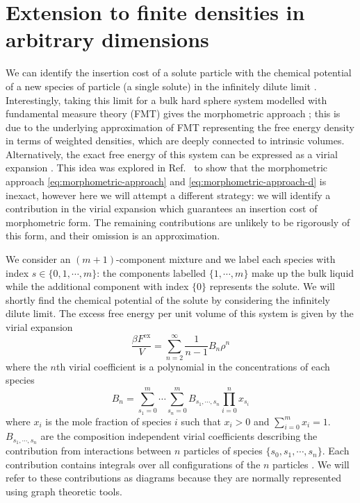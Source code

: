 \documentclass[11pt,twoside]{report}
\begin{document}
\section{Extension to finite densities in arbitrary dimensions}
\label{sec:finite-densities}

We can identify the insertion cost of a solute particle with the chemical potential of a new species of particle (a single solute) in the infinitely dilute limit \cite{ReissJCP1959,Hansen-GoosJPCM2006,Hansen-GoosJCP2014}.
Interestingly, taking this limit for a bulk hard sphere system modelled with fundamental measure theory (FMT) gives the morphometric approach \cite{Hansen-GoosJPCM2006}; this is due to the underlying approximation of FMT representing the free energy density in terms of weighted densities, which are deeply connected to intrinsic volumes.
Alternatively, the exact free energy of this system can be expressed as a virial expansion \cite{Hansen2013}.
This idea was explored in Ref.\ \cite{Hansen-GoosJPCM2006} to show that the morphometric approach \eqref{eq:morphometric-approach} and \eqref{eq:morphometric-approach-d} is inexact, however here we will attempt a different strategy: we will identify a contribution in the virial expansion which guarantees an insertion cost of morphometric form.
The remaining contributions are unlikely to be rigorously of this form, and their omission is an approximation.

We consider an $(m+1)$-component mixture and we label each species with index $s \in \{0, 1, \cdots, m\}$: the components labelled $\{1, \cdots, m\}$ make up the bulk liquid while the additional component with index $\{0\}$ represents the solute.
We will shortly find the chemical potential of the solute by considering the infinitely dilute limit.
The excess free energy per unit volume of this system is given by the virial expansion \cite{Hansen2013,Santos2016}
\begin{equation}
  \frac{\beta F^\mathrm{ex}}{V} =
  \sum_{n=2}^\infty
  \frac{1}{n-1}
  B_n
  \rho^n
\end{equation}
where the $n$th virial coefficient is a polynomial in the concentrations of each species
\begin{equation}
  B_n =
  \sum_{s_1=0}^m \cdots \sum_{s_n=0}^m
  B_{s_1, \cdots, s_n} \prod_{i=0}^n x_{s_i}
\end{equation}
where $x_i$ is the mole fraction of species $i$ such that $x_i > 0$ and $\sum_{i=0}^m x_i = 1$.
$B_{s_1, \cdots, s_n}$ are the composition independent virial coefficients describing the contribution from interactions between $n$ particles of species $\{s_0, s_1, \cdots, s_n\}$.
Each contribution contains integrals over all configurations of the $n$ particles \cite{Hansen2013,Santos2016}.
We will refer to these contributions as diagrams because they are normally represented using graph theoretic tools.
\end{document}
